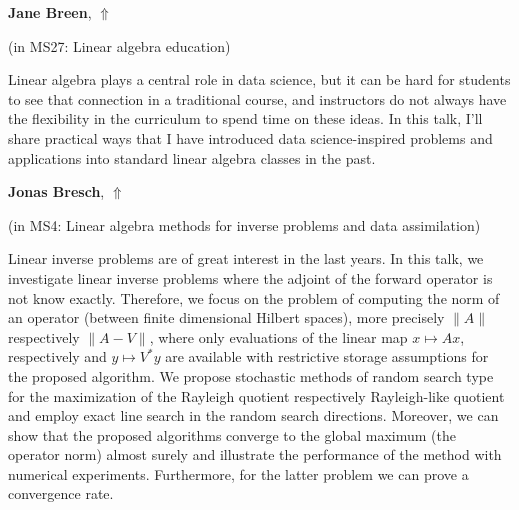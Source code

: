 \documentclass[ILAS2025-program.tex]{subfiles}
\begin{document}
\hypertarget{down0332}{}\begin{ilasabstract}
    
\textbf{Jane Breen},  \hfill \hyperlink{up0332}{$\Uparrow$}
    
    
(in {\color{mstitle}MS27: Linear algebra education})
        
\mtskip
    Linear algebra plays a central role in data science, but it can be hard for students to see that connection in a traditional course, and instructors do not always have the flexibility in the curriculum to spend time on these ideas. In this talk, I’ll share practical ways that I have introduced data science-inspired problems and applications into standard linear algebra classes in the past. 

\end{ilasabstract}
    

\hypertarget{down0203}{}\begin{ilasabstract}
    
\textbf{Jonas Bresch},  \hfill \hyperlink{up0203}{$\Uparrow$}
    
    
(in {\color{mstitle}MS4: Linear algebra methods for inverse problems and data assimilation})
        
\mtskip
    Linear inverse problems are of great interest in the last years.
In this talk, we investigate linear inverse problems where the adjoint of the forward operator is not know exactly.
Therefore, we focus on the problem of computing the norm of an operator (between finite dimensional Hilbert spaces),
more precisely $\|A\|$ respectively $\|A - V\|$,
where only evaluations of the linear map $x \mapsto A x$, 
respectively and $y \mapsto V^*y$ are available 
with restrictive storage assumptions for the proposed algorithm.
We propose stochastic methods of random search type for the maximization of the Rayleigh quotient
respectively Rayleigh-like quotient
and employ exact line search in the random search directions.
Moreover, 
we can show that the proposed algorithms converge to the global maximum 
(the operator norm) almost surely 
and illustrate the performance of the method with numerical experiments.
Furthermore, 
for the latter problem we can prove a convergence rate.

\end{ilasabstract}
    
\end{document}
